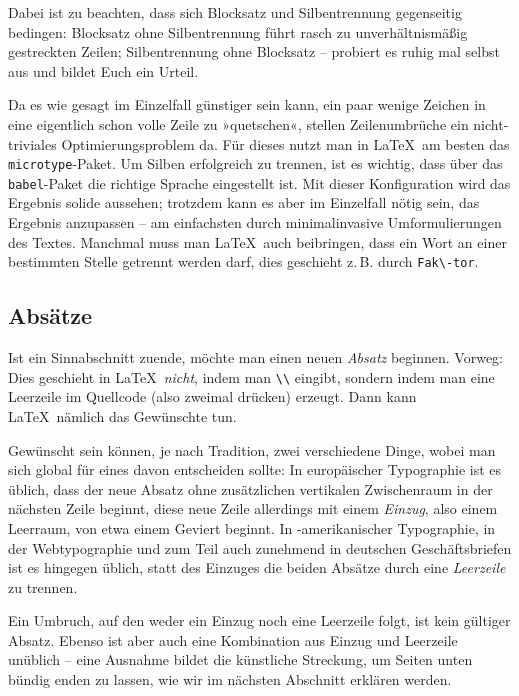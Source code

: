 Dabei ist zu beachten, dass sich Blocksatz und Silbentrennung gegenseitig
bedingen: Blocksatz ohne Silbentrennung führt rasch zu unverhältnismäßig
gestreckten Zeilen; Silbentrennung ohne Blocksatz – probiert es ruhig mal selbst
aus und bildet Euch ein Urteil.

Da es wie gesagt im Einzelfall günstiger sein kann, ein paar wenige Zeichen in
eine eigentlich schon volle Zeile zu »quetschen«, stellen Zeilenumbrüche ein
nicht-triviales Optimierungsproblem da. Für dieses nutzt man in \LaTeX\ am
besten das \verb!microtype!-Paket. Um Silben erfolgreich zu trennen, ist es
wichtig, dass über das \verb!babel!-Paket die richtige Sprache eingestellt ist.
Mit dieser Konfiguration wird das Ergebnis solide aussehen; trotzdem kann es
aber im Einzelfall nötig sein, das Ergebnis anzupassen – am einfachsten durch
minimalinvasive Umformulierungen des Textes. Manchmal muss man \LaTeX\ auch
beibringen, dass ein Wort an einer bestimmten Stelle getrennt werden darf, dies
geschieht z.\,B. durch \verb!Fak\-tor!.

\subsection{Absätze}

Ist ein Sinnabschnitt zuende, möchte man einen neuen \emph{Absatz}
beginnen. Vorweg: Dies geschieht in \LaTeX\ \emph{nicht}, indem man \verb!\\!
eingibt, sondern indem man eine Leerzeile im Quellcode (also zweimal
\keys{\return} drücken) erzeugt. Dann kann \LaTeX\ nämlich das Gewünschte tun.

Gewünscht sein können, je nach Tradition, zwei verschiedene Dinge, wobei man
sich global für eines davon entscheiden sollte: In europäischer Typographie ist
es üblich, dass der neue Absatz ohne zusätzlichen vertikalen Zwischenraum in der
nächsten Zeile beginnt, diese neue Zeile allerdings mit einem \emph{Einzug},
also einem Leerraum, von etwa einem Geviert beginnt. In -amerikanischer
Typographie, in der Webtypographie und zum Teil auch zunehmend in deutschen
Geschäftsbriefen ist es hingegen üblich, statt des Einzuges die beiden Absätze
durch eine \emph{Leerzeile} zu trennen.

Ein Umbruch, auf den weder ein Einzug noch eine Leerzeile folgt, ist kein
gültiger Absatz.  Ebenso ist aber auch eine Kombination aus Einzug und Leerzeile
unüblich – eine Ausnahme bildet die künstliche Streckung, um Seiten unten bündig
enden zu lassen, wie wir im nächsten Abschnitt erklären werden.

